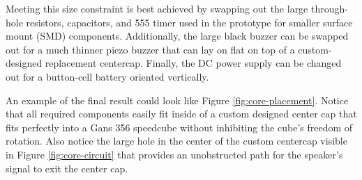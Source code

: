 Meeting this size constraint is best achieved by swapping out the large
through-hole resistors, capacitors, and 555 timer used in the prototype
for smaller surface mount (SMD) components. Additionally, the large
black buzzer can be swapped out for a much thinner piezo buzzer that
can lay on flat on top of a custom-designed replacement centercap.
Finally, the DC power supply can be changed out for a button-cell
battery oriented vertically.

An example of the final result could look like Figure
\ref{fig:core-placement}. Notice that all required components easily
fit inside of a custom designed center cap that fits perfectly into a
Gans 356 speedcube without inhibiting the cube's freedom of rotation.
Also notice the large hole in the center of the custom centercap
visible in Figure \ref{fig:core-circuit} that provides an unobstructed
path for the speaker's signal to exit the center cap.

